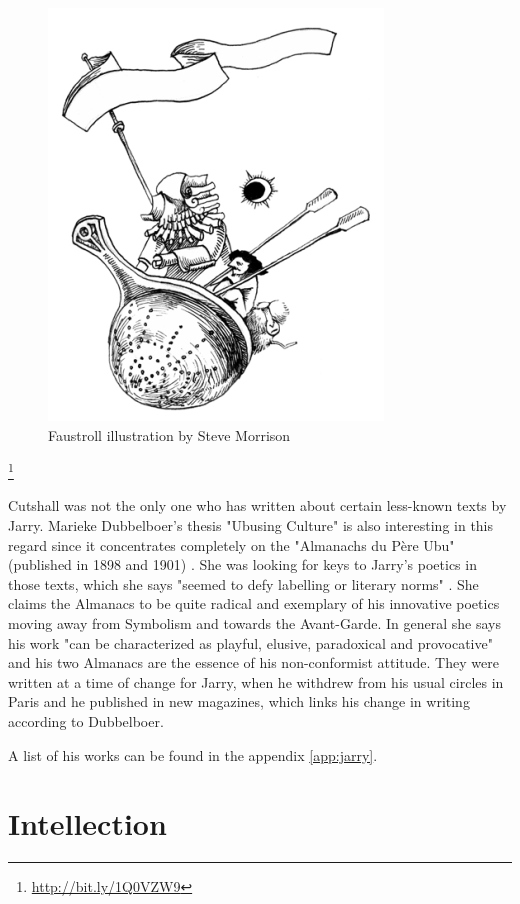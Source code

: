 \begin{figure}[htb]
  \centering
  \includegraphics[height=0.3\textheight]{images/faustroll}
  \caption[Faustroll]{Faustroll illustration by Steve Morrison}
  \label{fig:FAUSTROLL}
\end{figure}\footnote{\url{http://bit.ly/1Q0VZW9}} %

Cutshall was not the only one who has written about certain less-known texts by Jarry. Marieke Dubbelboer's thesis "Ubusing Culture" is also interesting in this regard since it concentrates completely on the "Almanachs du Père Ubu" (published in 1898 and 1901) \citep{Dubbelboer2009}. She was looking for keys to Jarry's poetics in those texts, which she says "seemed to defy labelling or literary norms" \citep[p.10]{Dubbelboer2009}. She claims the Almanacs to be quite radical and exemplary of his innovative poetics moving away from Symbolism and towards the Avant-Garde. In general she says his work "can be characterized as playful, elusive, paradoxical and provocative" \citep[p.197]{Dubbelboer2009} and his two Almanacs are the essence of his non-conformist attitude. They were written at a time of change for Jarry, when he withdrew from his usual circles in Paris and he published in new magazines, which links his change in writing according to Dubbelboer.

A list of his works can be found in the appendix \ref{app:jarry}.


\section{Intellection}

